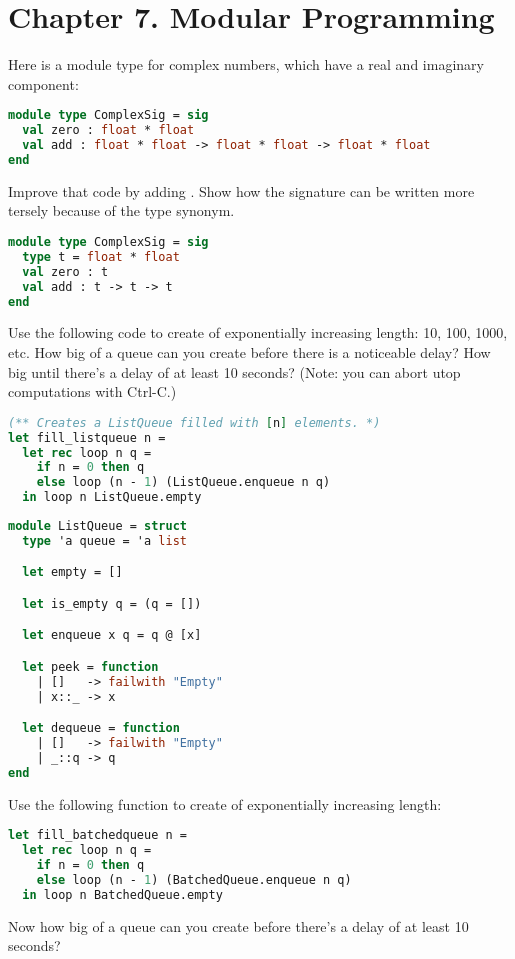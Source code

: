\section*{Chapter 7. Modular Programming}

Here is a module type for complex numbers, which have a real and imaginary component:
\begin{lstlisting}[language=OCaml]
module type ComplexSig = sig
  val zero : float * float
  val add : float * float -> float * float -> float * float
end
\end{lstlisting}
Improve that code by adding . Show how the signature can be written more tersely because of the type synonym.

\begin{lstlisting}[language=OCaml]
module type ComplexSig = sig
  type t = float * float
  val zero : t
  val add : t -> t -> t
end
\end{lstlisting}

Use the following code to create  of exponentially increasing length: 10, 100, 1000, etc. How big of a queue can you create before there is a noticeable delay? How big until there's a delay of at least 10 seconds? (Note: you can abort utop computations with Ctrl-C.)
\begin{lstlisting}[language=OCaml]
(** Creates a ListQueue filled with [n] elements. *)
let fill_listqueue n =
  let rec loop n q =
    if n = 0 then q
    else loop (n - 1) (ListQueue.enqueue n q)
  in loop n ListQueue.empty
\end{lstlisting}

\begin{lstlisting}[language=OCaml]
module ListQueue = struct
  type 'a queue = 'a list

  let empty = []

  let is_empty q = (q = [])

  let enqueue x q = q @ [x]

  let peek = function
    | []   -> failwith "Empty"
    | x::_ -> x

  let dequeue = function
    | []   -> failwith "Empty"
    | _::q -> q
end
\end{lstlisting}

Use the following function to create  of exponentially increasing length:
\begin{lstlisting}[language=OCaml]
let fill_batchedqueue n =
  let rec loop n q =
    if n = 0 then q
    else loop (n - 1) (BatchedQueue.enqueue n q)
  in loop n BatchedQueue.empty
\end{lstlisting}
Now how big of a queue can you create before there's a delay of at least 10 seconds?

